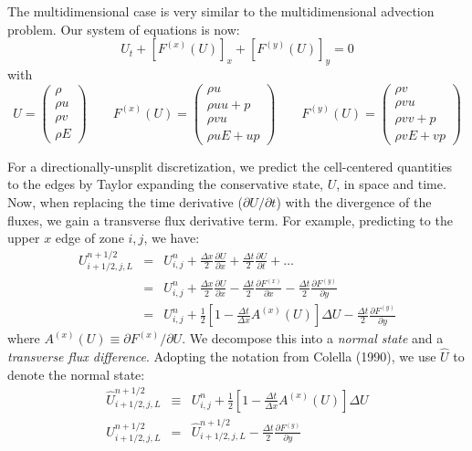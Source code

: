 The multidimensional case is very similar to the multidimensional
advection problem.  Our system of equations is now:
\begin{equation}
U_t + [F^{(x)}(U)]_x + [F^{(y)}(U)]_y = 0
\end{equation}
with
\begin{equation}
U = \left ( \begin{array}{c} \rho \\ \rho u \\ \rho v \\ \rho E \end{array} \right )
%
\qquad
%
F^{(x)}(U) = \left ( \begin{array}{c} \rho u \\ \rho uu + p \\ \rho v u \\ \rho u E + up \end{array} \right )
%
\qquad
F^{(y)}(U) = \left ( \begin{array}{c} \rho v \\ \rho vu     \\ \rho v v + p \\ \rho v E + vp \end{array} \right )
\end{equation}

For a directionally-unsplit discretization, we predict the
cell-centered quantities to the edges by Taylor expanding the
conservative state, $U$, in space and time.  Now, when replacing the
time derivative ($\partial U/\partial t$) with the divergence of the
fluxes, we gain a transverse flux derivative term.  For example,
predicting to the upper $x$ edge of zone $i,j$, we have:
\begin{eqnarray}
U_{i+1/2,j,L}^{n+1/2} &=& U_{i,j}^n + \frac{\Delta x}{2} \frac{\partial U}{\partial x} 
                            + \frac{\Delta t}{2} \frac{\partial U}{\partial t} + \ldots \\
&=& U_{i,j}^n + \frac{\Delta x}{2} \frac{\partial U}{\partial x} 
                            - \frac{\Delta t}{2} \frac{\partial F^{(x)}}{\partial x} 
                            - \frac{\Delta t}{2} \frac{\partial F^{(y)}}{\partial y} \\
&=& U_{i,j}^n + \frac{1}{2} \left [ 1 - \frac{\Delta t}{\Delta x} A^{(x)}(U) \right ] \Delta U 
                            - \frac{\Delta t}{2} \frac{\partial F^{(y)}}{\partial y} \label{eq:Utaylorstate}
\end{eqnarray}
where $A^{(x)}(U) \equiv \partial F^{(x)} / \partial U$.  We decompose
this into a {\em normal state} and a {\em transverse flux difference}.
Adopting the notation from Colella (1990), we use $\hat{U}$ to denote
the normal state:
\begin{eqnarray}
\hat{U}_{i+1/2,j,L}^{n+1/2} &\equiv& U_{i,j}^n 
      + \frac{1}{2} \left [ 1 - \frac{\Delta t}{\Delta x} A^{(x)}(U) \right ] \Delta U \\
U_{i+1/2,j,L}^{n+1/2} &=& \hat{U}_{i+1/2,j,L}^{n+1/2}
                            - \frac{\Delta t}{2} \frac{\partial F^{(y)}}{\partial y}  \label{eq:fullleftstate}
\end{eqnarray}

